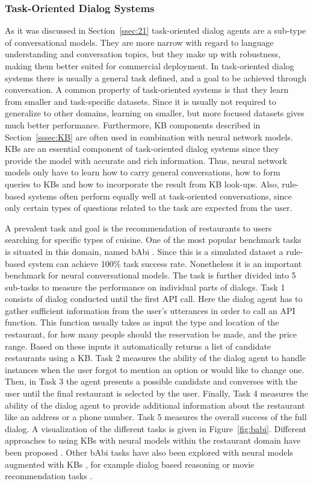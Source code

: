 \documentclass[12pt]{article}
\begin{document}
\subsubsection{Task-Oriented Dialog Systems} \label{sssec:task}
As it was discussed in Section~\ref{ssec:21} task-oriented dialog agents are a sub-type of conversational models. They are more narrow with regard to language understanding and conversation topics, but they make up with robustness, making them better suited for commercial deployment. In task-oriented dialog systems there is usually a general task defined, and a goal to be achieved through conversation. A common property of task-oriented systems is that they learn from smaller and task-specific datasets. Since it is usually not required to generalize to other domains, learning on smaller, but more focused datasets gives much better performance. Furthermore, KB components described in Section~\ref{sssec:KB} are often used in combination with neural network models. KBs are an essential component of task-oriented dialog systems since they provide the model with accurate and rich information. Thus, neural network models only have to learn how to carry general conversations, how to form queries to KBs and how to incorporate the result from KB look-ups. Also, rule-based systems often perform equally well at task-oriented conversations, since only certain types of questions related to the task are expected from the user.

A prevalent task and goal is the recommendation of restaurants to users searching for specific types of cuisine. One of the most popular benchmark tasks is situated in this domain, named bAbi \cite{Bordes:2016,Joshi:2017,bAbi}. Since this is a simulated dataset a rule-based system can achieve 100\(\%\) task success rate. Nonetheless it is an important benchmark for neural conversational models. The task is further divided into 5 sub-tasks to measure the performance on individual parts of dialogs. Task 1 consists of dialog conducted until the first API call. Here the dialog agent has to gather sufficient information from the user's utterances in order to call an API function. This function usually takes as input the type and location of the restaurant, for how many people should the reservation be made, and the price range. Based on these inputs it automatically returns a list of candidate restaurants using a KB. Task 2 measures the ability of the dialog agent to handle instances when the user forgot to mention an option or would like to change one. Then, in Task 3 the agent presents a possible candidate and converses with the user until the final restaurant is selected by the user. Finally, Task 4 measures the ability of the dialog agent to provide additional information about the restaurant like an address or a phone number. Task 5 measures the overall success of the full dialog. A visualization of the different tasks is given in Figure~\ref{fig:babi}. Different approaches to using KBs with neural models within the restaurant domain have been proposed \cite{Wen:2016,Eric:2017,Williams:2017}. Other bAbi tasks have also been explored with neural models augmented with KBs \cite{Williams:2017,Li_HIL:2016}, for example dialog based reasoning \cite{Weston:2015} or movie recommendation tasks \cite{Miller:2016,Dodge:2015}.
\end{document}
